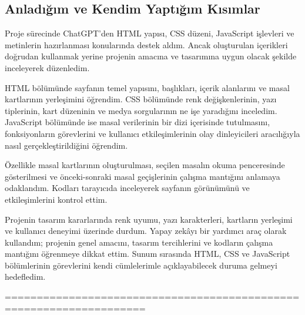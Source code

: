 \documentclass[12pt,a4paper]{article}
\begin{document}
\subsection{Anladığım ve Kendim Yaptığım Kısımlar}
Proje sürecinde ChatGPT'den HTML yapısı, CSS düzeni, JavaScript işlevleri ve metinlerin hazırlanması konularında destek aldım. Ancak oluşturulan içerikleri doğrudan kullanmak yerine projenin amacına ve tasarımına uygun olacak şekilde inceleyerek düzenledim.

HTML bölümünde sayfanın temel yapısını, başlıkları, içerik alanlarını ve masal kartlarının yerleşimini öğrendim. CSS bölümünde renk değişkenlerinin, yazı tiplerinin, kart düzeninin ve medya sorgularının ne işe yaradığını inceledim. JavaScript bölümünde ise masal verilerinin bir dizi içerisinde tutulmasını, fonksiyonların görevlerini ve kullanıcı etkileşimlerinin olay dinleyicileri aracılığıyla nasıl gerçekleştirildiğini öğrendim.

Özellikle masal kartlarının oluşturulması, seçilen masalın okuma penceresinde gösterilmesi ve önceki-sonraki masal geçişlerinin çalışma mantığını anlamaya odaklandım. Kodları tarayıcıda inceleyerek sayfanın görünümünü ve etkileşimlerini kontrol ettim.

Projenin tasarım kararlarında renk uyumu, yazı karakterleri, kartların yerleşimi ve kullanıcı deneyimi üzerinde durdum. Yapay zekâyı bir yardımcı araç olarak kullandım; projenin genel amacını, tasarım tercihlerini ve kodların çalışma mantığını öğrenmeye dikkat ettim. Sunum sırasında HTML, CSS ve JavaScript bölümlerinin görevlerini kendi cümlelerimle açıklayabilecek duruma gelmeyi hedefledim.

====================================================================
\end{document}
